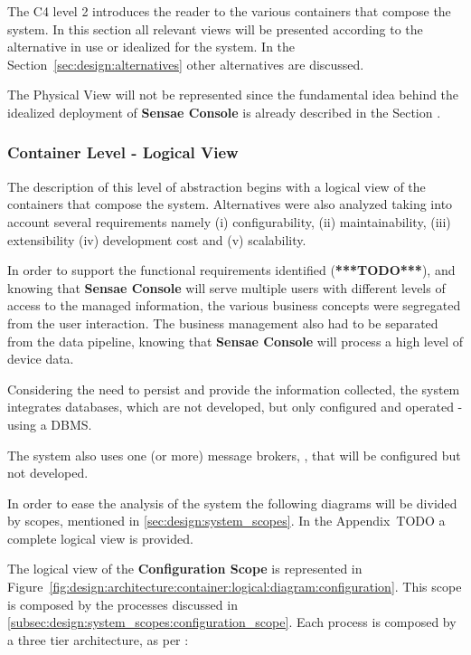 The C4 level 2 introduces the reader to the various containers that compose the system. In this section all relevant views will be presented according to the alternative in use or idealized for the system. In the Section~\ref{sec:design:alternatives} other alternatives are discussed. 

The Physical View will not be represented since the fundamental idea behind the idealized deployment of \textbf{Sensae Console} is already described in the Section .

\subsubsection*{Container Level - Logical View}
\label{subsubsec:design:architecture:container:logical}

The description of this level of abstraction begins with a logical view of the containers that compose the system. Alternatives were also analyzed taking into account several requirements namely (i) configurability, (ii) maintainability, (iii) extensibility (iv) development cost and (v) scalability.

In order to support the functional requirements identified (\textbf{***TODO***}), and knowing that \textbf{Sensae Console} will serve multiple users with different levels of access to the managed information, the various business concepts were segregated from the user interaction. The business management also had to be separated from the  data pipeline, knowing that \textbf{Sensae Console} will process a high level of device data.

Considering the need to persist and provide the information collected, the system integrates databases, which are not developed, but only configured and operated - using a \gls{DBMS}.

The system also uses one (or more) message brokers, \cite{broker}, that will be configured but not developed.

In order to ease the analysis of the system the following diagrams will be divided by scopes, mentioned in \ref{sec:design:system_scopes}. In the Appendix~TODO a complete logical view is provided.

The logical view of the \textbf{Configuration Scope} is represented in Figure~\ref{fig:design:architecture:container:logical:diagram:configuration}. This scope is composed by the processes discussed in \ref{subsec:design:system_scopes:configuration_scope}. Each process is composed by a three tier architecture, as per \cite{3tier}:

